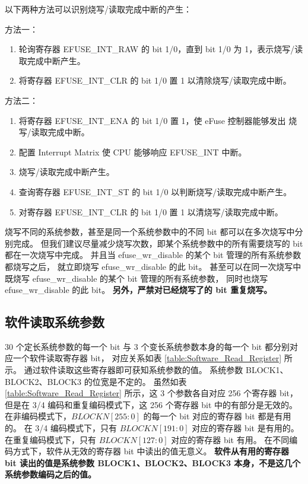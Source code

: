 \documentclass[main\_\_CN.tex]{subfiles}
\begin{document}
以下两种方法可以识别烧写/读取完成中断的产生：

方法一：
\begin{enumerate}
    \item 轮询寄存器 EFUSE\_INT\_RAW 的 bit 1/0，直到 bit 1/0 为 1，表示烧写/读取完成中断产生。
    \item 将寄存器 EFUSE\_INT\_CLR 的 bit 1/0 置 1 以清除烧写/读取完成中断。
\end{enumerate}

方法二：
\begin{enumerate}
    \item 将寄存器 EFUSE\_INT\_ENA 的 bit 1/0 置 1，使 eFuse 控制器能够发出 烧写/读取完成中断。
    \item 配置 Interrupt Matrix 使 CPU 能够响应 EFUSE\_INT 中断。
    \item 烧写/读取完成中断产生。
    \item 查询寄存器 EFUSE\_INT\_ST 的 bit 1/0 以判断烧写/读取完成中断产生。
    \item 对寄存器 EFUSE\_INT\_CLR 的 bit 1/0 置 1 以清烧写/读取完成中断。
\end{enumerate}
烧写不同的系统参数，甚至是同一个系统参数中的不同 bit 都可以在多次烧写中分别完成。
但我们建议尽量减少烧写次数，即某个系统参数中的所有需要烧写的 bit 都在一次烧写中完成。
并且当 efuse\_wr\_disable 的某个 bit 管理的所有系统参数都烧写之后，
就立即烧写 efuse\_wr\_disable 的此 bit。
甚至可以在同一次烧写中既烧写 efuse\_wr\_disable 的某个 bit 管理的所有系统参数，
同时也烧写 efuse\_wr\_disable 的此 bit。
\textbf{另外，严禁对已经烧写了的 bit 重复烧写。}

\subsection{软件读取系统参数}

30 个定长系统参数的每一个 bit 与 3 个变长系统参数本身的每一个 bit 都分别对应一个软件读取寄存器 bit，
对应关系如表 \ref{table:Software_Read_Register} 所示。
通过软件读取这些寄存器即可获知系统参数的值。
\hypertarget{software_read_BLOCKN}{}
系统参数 BLOCK1、BLOCK2、BLOCK3 的位宽是不定的。
虽然如表 \ref{table:Software_Read_Register} 所示，这 3 个参数各自对应 256 个寄存器 bit，
但是在 3/4 编码和重复编码模式下，这 256 个寄存器 bit 中的有部分是无效的。
在非编码模式下，\begin{math}BLOCKN[255:0]\end{math} 的每一个 bit 对应的寄存器 bit 都是有用的。
在 3/4 编码模式下，只有 \begin{math}BLOCKN[191:0]\end{math} 对应的寄存器 bit 是有用的。
在重复编码模式下，只有 \begin{math}BLOCKN[127:0]\end{math} 对应的寄存器 bit 有用。
在不同编码方式下，软件从无效的寄存器 bit 中读出的值无意义。
\textbf{软件从有用的寄存器 bit 读出的值是系统参数 BLOCK1、BLOCK2、BLOCK3 本身，不是这几个系统参数编码之后的值。}
\end{document}
